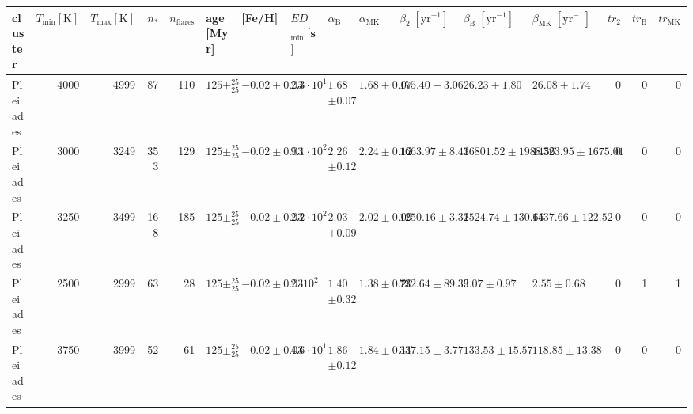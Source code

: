 \begin{tabular}{lrrrrllllllllrrr}
\toprule
  cluster &  $T_\mathrm{min} [\mathrm{K}]$ &  $T_\mathrm{max} [\mathrm{K}]$ &  $n_*$ &  $n_\mathrm{flares}$ &               age [Myr] &          [Fe/H] & $ED$$_\mathrm{min}\;[$s$]$ & $\alpha_\mathrm{B}$ & $\alpha_\mathrm{MK}$ & $\beta_2\;[\mathrm{yr}^{-1}]$ & $\beta_\mathrm{B}\;[\mathrm{yr}^{-1}]$ & $\beta_\mathrm{MK}\;[\mathrm{yr}^{-1}]$ &  $tr_2$ &  $tr_\mathrm{B}$ &  $tr_\mathrm{MK}$ \\
\midrule
 Pleiades &                           4000 &                           4999 &     87 &                  110 &     $125\pm _{25}^{25}$ &  $-0.02\pm0.03$ &        $2.3 \cdot 10^{1}$ &     $1.68$$\pm0.07$ &        $1.68\pm0.07$ &               $175.40\pm3.06$ &                         $26.23\pm1.80$ &                          $26.08\pm1.74$ &       0 &                0 &                 0 \\
 Pleiades &                           3000 &                           3249 &    353 &                  129 &     $125\pm _{25}^{25}$ &  $-0.02\pm0.03$ &        $9.1 \cdot 10^{2}$ &     $2.26$$\pm0.12$ &        $2.24\pm0.12$ &              $1663.97\pm8.43$ &                   $16801.52\pm1988.56$ &                    $14323.95\pm1675.01$ &       0 &                0 &                 0 \\
 Pleiades &                           3250 &                           3499 &    168 &                  185 &     $125\pm _{25}^{25}$ &  $-0.02\pm0.03$ &        $2.2 \cdot 10^{2}$ &     $2.03$$\pm0.09$ &        $2.02\pm0.09$ &              $1250.16\pm3.32$ &                     $1524.74\pm130.65$ &                      $1437.66\pm122.52$ &       0 &                0 &                 0 \\
 Pleiades &                           2500 &                           2999 &     63 &                   28 &     $125\pm _{25}^{25}$ &  $-0.02\pm0.03$ &          $2 \cdot 10^{2}$ &     $1.40$$\pm0.32$ &        $1.38\pm0.26$ &              $732.64\pm89.39$ &                          $3.07\pm0.97$ &                           $2.55\pm0.68$ &       0 &                1 &                 1 \\
 Pleiades &                           3750 &                           3999 &     52 &                   61 &     $125\pm _{25}^{25}$ &  $-0.02\pm0.03$ &        $4.6 \cdot 10^{1}$ &     $1.86$$\pm0.12$ &        $1.84\pm0.11$ &               $337.15\pm3.77$ &                       $133.53\pm15.57$ &                        $118.85\pm13.38$ &       0 &                0 &                 0 \\

\end{tabular}
